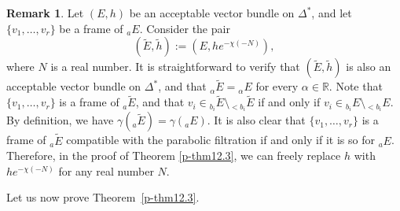\documentclass[12pt,twoside]{amsart}
\theoremstyle{definition}
\newtheorem{rem}[thm]{Remark}
\begin{document}
\begin{rem}\label{p-rem12.6}
Let $(E, h)$ be an acceptable vector bundle on $\Delta^*$, and let 
$\{v_1, \ldots, v_r\}$ be a frame of ${}_a E$. 
Consider the pair
\[
(\widetilde E, \widetilde h) := \left(E, h e^{-\chi(-N)}\right),
\]
where $N$ is a real number. 
It is straightforward to verify that 
$(\widetilde E, \widetilde h)$ is also an acceptable 
vector bundle on $\Delta^*$, and that 
${}_\alpha \widetilde E = {}_\alpha E$ for every 
$\alpha \in \mathbb{R}$. 
Note that $\{v_1, \ldots, v_r\}$ is a frame of 
${}_a \widetilde E$, and that 
$v_i \in {}_{b_i}\widetilde E \setminus 
{}_{<b_i}\widetilde E$ if and only if 
$v_i \in {}_{b_i}E \setminus 
{}_{<b_i}E$. 
By definition, we have 
$\gamma ({}_a \widetilde E) = \gamma ({}_a E)$. 
It is also clear that 
$\{v_1, \ldots, v_r\}$ is a frame of ${}_a \widetilde E$ compatible 
with the parabolic filtration if and only if it is so for 
${}_a E$. 
Therefore, in the proof of Theorem \ref{p-thm12.3}, we can freely replace 
$h$ with 
$he^{-\chi(-N)}$ for any real number $N$. 
\end{rem}

Let us now prove Theorem~\ref{p-thm12.3}.
\end{document}
